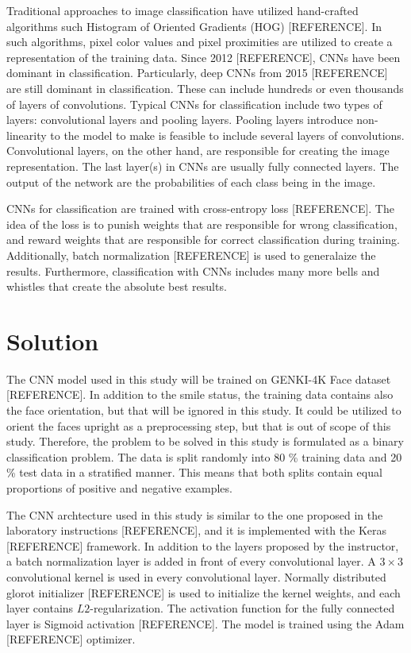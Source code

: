 \documentclass{article}
\begin{document}
Traditional approaches to image classification have utilized
hand-crafted algorithms such Histogram of Oriented Gradients (HOG)
[REFERENCE]. In such algorithms, pixel color values and pixel
proximities are utilized to create a representation of the training
data. Since 2012 [REFERENCE], CNNs have been dominant in
classification. Particularly, deep CNNs from 2015 [REFERENCE] are
still dominant in classification. These can include hundreds or even
thousands of layers of convolutions. Typical CNNs for classification
include two types of layers: convolutional layers and pooling layers.
Pooling layers introduce non-linearity to the model to make is
feasible to include several layers of convolutions. Convolutional
layers, on the other hand, are responsible for creating the image
representation. The last layer(s) in CNNs are usually fully connected
layers. The output of the network are the probabilities of each class
being in the image.

CNNs for classification are trained with cross-entropy loss
[REFERENCE]. The idea of the loss is to punish weights that are
responsible for wrong classification, and reward weights that are
responsible for correct classification during training. Additionally,
batch normalization [REFERENCE] is used to generalaize the results.
Furthermore, classification with CNNs includes many more bells and
whistles that create the absolute best results.

\section{Solution}\label{sec:solution}
The CNN model used in this study will be trained on GENKI-4K Face
dataset [REFERENCE]. In addition to the smile status, the training
data contains also the face orientation, but that will be ignored in
this study. It could be utilized to orient the faces upright as a
preprocessing step, but that is out of scope of this study. Therefore,
the problem to be solved in this study is formulated as a binary
classification problem. The data is split randomly into 80 \% training
data and 20 \% test data in a stratified manner. This means that both
splits contain equal proportions of positive and negative examples.

The CNN archtecture used in this study is similar to the one proposed
in the laboratory instructions [REFERENCE], and it is implemented with
the Keras [REFERENCE] framework. In addition to the layers proposed by
the instructor, a batch normalization layer is added in front of every
convolutional layer. A $3 \times 3$ convolutional kernel is used in
every convolutional layer. Normally distributed glorot initializer
[REFERENCE] is used to initialize the kernel weights, and each layer
contains $L2$-regularization. The activation function for the fully
connected layer is Sigmoid activation [REFERENCE]. The model is
trained using the Adam [REFERENCE] optimizer.
\end{document}
